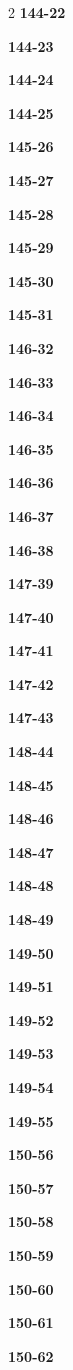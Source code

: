 \documentclass[10pt,a4paper]{article}
\begin{document}
\begin{multicols}{2}
\noindent\textbf{144-22}\ \par
\noindent\textbf{144-23}\ \par
\noindent\textbf{144-24}\ \par
\noindent\textbf{144-25}\ \par
\noindent\textbf{145-26}\ \par
\noindent\textbf{145-27}\ \par
\noindent\textbf{145-28}\ \par
\noindent\textbf{145-29}\ \par
\noindent\textbf{145-30}\ \par
\noindent\textbf{145-31}\ \par
\noindent\textbf{146-32}\ \par
\noindent\textbf{146-33}\ \par
\noindent\textbf{146-34}\ \par
\noindent\textbf{146-35}\ \par
\noindent\textbf{146-36}\ \par
\noindent\textbf{146-37}\ \par
\noindent\textbf{146-38}\ \par
\noindent\textbf{147-39}\ \par
\noindent\textbf{147-40}\ \par
\noindent\textbf{147-41}\ \par
\noindent\textbf{147-42}\ \par
\noindent\textbf{147-43}\ \par
\noindent\textbf{148-44}\ \par
\noindent\textbf{148-45}\ \par
\noindent\textbf{148-46}\ \par
\noindent\textbf{148-47}\ \par
\noindent\textbf{148-48}\ \par
\noindent\textbf{148-49}\ \par
\noindent\textbf{149-50}\ \par
\noindent\textbf{149-51}\ \par
\noindent\textbf{149-52}\ \par
\noindent\textbf{149-53}\ \par
\noindent\textbf{149-54}\ \par
\noindent\textbf{149-55}\ \par
\noindent\textbf{150-56}\ \par
\noindent\textbf{150-57}\ \par
\noindent\textbf{150-58}\ \par
\noindent\textbf{150-59}\ \par
\noindent\textbf{150-60}\ \par
\noindent\textbf{150-61}\ \par
\noindent\textbf{150-62}\ \par
\end{multicols}
\end{document}
